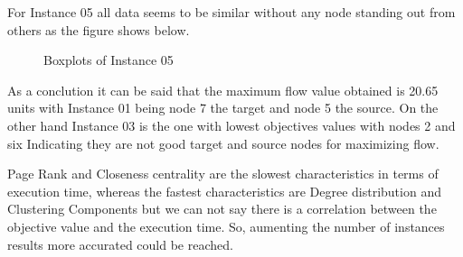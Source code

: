 \documentclass[10pt,a4paper,openany]{article}
\begin{document}
For Instance 05 all data seems to be similar without any node standing out from others as the figure shows below.
\begin{figure}[H]
	\centering
	
	\caption{Boxplots of Instance 05} \label{fig:instances}
\end{figure}	

As a conclution it can be said that the maximum flow value obtained is 20.65 units with Instance 01 being node 7 the target and node 5 the source. On the other hand Instance 03 is the one with lowest objectives values with nodes 2 and six Indicating they are not good target and source nodes for maximizing flow.

Page Rank and Closeness centrality are the slowest characteristics in terms of execution time, whereas the fastest characteristics are Degree distribution and Clustering Components but we can not say there is a correlation between the objective value and the execution time. So, aumenting the number of instances results more accurated could be reached.
	
	
	
	
\end{document}
